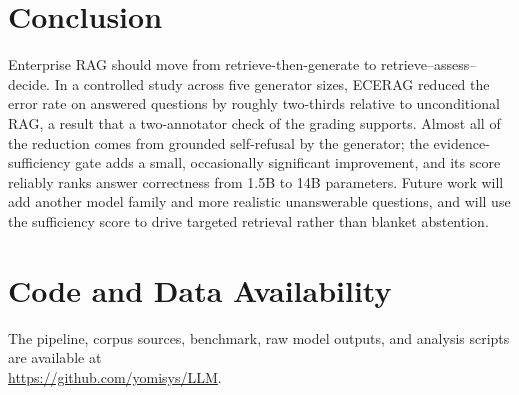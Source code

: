 \documentclass[conference,letterpaper]{IEEEtran}
\begin{document}
\section{Conclusion}
Enterprise RAG should move from retrieve-then-generate to retrieve--assess--decide. In a
controlled study across five generator sizes, ECERAG reduced the error rate on answered questions
by roughly two-thirds relative to unconditional RAG, a result that a two-annotator check of
the grading supports. Almost all of the reduction comes from grounded self-refusal by the generator; the
evidence-sufficiency gate adds a small, occasionally significant improvement, and its score
reliably ranks answer correctness from 1.5B to 14B parameters. Future work will add another
model family and more realistic unanswerable questions, and will use the
sufficiency score to drive targeted retrieval rather than blanket abstention.

\section*{Code and Data Availability}
The pipeline, corpus sources, benchmark, raw model outputs, and analysis scripts are available
at\\ \url{https://github.com/yomisys/LLM}.

\balance


\end{document}
